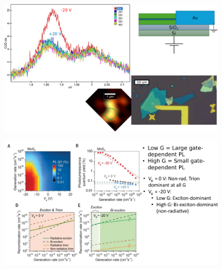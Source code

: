 \documentclass[double,12pt,1in]{beavtex}
\begin{document}
\begin{figure}
    \includegraphics[width=1\textwidth]{Second Vg sweep.pdf}
    \caption{}
\end{figure}

\begin{figure}
    \includegraphics[width=1\textwidth]{exciton dynamics summary.pdf}
    \caption{}
\end{figure}
\end{document}
